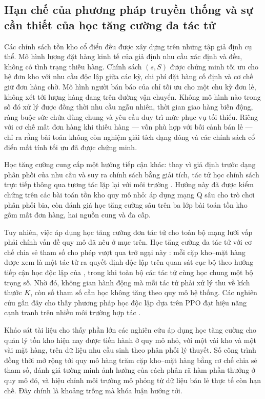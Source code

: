 \subsection{Hạn chế của phương pháp truyền thống và sự cần thiết của học tăng
cường đa tác tử}
\label{subsec:khoangtrong}

Các chính sách tồn kho cổ điển đều được xây dựng trên những tập giả định cụ
thể. Mô hình lượng đặt hàng kinh tế của \textcite{harris1913} giả định nhu cầu
xác định và đều, không có tình trạng thiếu hàng. Chính sách $(s, S)$ được
\textcite{scarf1960} chứng minh tối ưu cho hệ đơn kho với nhu cầu độc lập giữa
các kỳ, chi phí đặt hàng cố định và cơ chế giữ đơn hàng chờ. Mô hình người bán
báo của \textcite{arrow1951} chỉ tối ưu cho một chu kỳ đơn lẻ, không xét tới
lượng hàng đang trên đường vận chuyển. Không mô hình nào trong số đó xử lý được
đồng thời nhu cầu ngẫu nhiên, thời gian giao hàng biến động, ràng buộc sức chứa
dùng chung và yêu cầu duy trì mức phục vụ tối thiểu. Riêng với cơ chế mất đơn
hàng khi thiếu hàng --- vốn phù hợp với bối cảnh bán lẻ --- \textcite{zipkin2008}
chỉ ra rằng bài toán không còn nghiệm giải tích dạng đóng và các chính sách cổ
điển mất tính tối ưu đã được chứng minh.

Học tăng cường cung cấp một hướng tiếp cận khác: thay vì giả định trước dạng
phân phối của nhu cầu và suy ra chính sách bằng giải tích, tác tử học chính
sách trực tiếp thông qua tương tác lặp lại với môi trường
\parencite{sutton2018}. Hướng này đã được kiểm chứng trên các bài toán tồn kho
quy mô nhỏ: \textcite{oroojlooyjadid2022} áp dụng mạng Q sâu cho trò chơi phân
phối bia, còn \textcite{gijsbrechts2022} đánh giá học tăng cường sâu trên ba
lớp bài toán tồn kho gồm mất đơn hàng, hai nguồn cung và đa cấp.

Tuy nhiên, việc áp dụng học tăng cường đơn tác tử cho toàn bộ mạng lưới vấp
phải chính vấn đề quy mô đã nêu ở mục trên. Học tăng cường đa tác tử với cơ chế
chia sẻ tham số cho phép vượt qua trở ngại này \parencite{gupta2017}: mỗi cặp
kho--mặt hàng được xem là một tác tử ra quyết định độc lập trên quan sát cục
bộ theo hướng tiếp cận học độc lập của \textcite{tan1993}, trong khi toàn bộ
các tác tử cùng học chung một bộ trọng số. Nhờ đó, không gian hành động mà mỗi
tác tử phải xử lý thu về kích thước $K$, còn số tham số cần học không tăng theo
quy mô hệ thống. Các nghiên cứu gần đây cho thấy phương pháp học độc lập dựa
trên PPO đạt hiệu năng cạnh tranh trên nhiều môi trường hợp tác
\parencite{dewitt2020ippo, yu2022mappo}.

Khảo sát tài liệu cho thấy phần lớn các nghiên cứu áp dụng học tăng cường cho
quản lý tồn kho hiện nay được tiến hành ở quy mô nhỏ, với một vài kho và một
vài mặt hàng, trên dữ liệu nhu cầu sinh theo phân phối lý thuyết. Số công trình
đồng thời mở rộng tới quy mô hàng trăm cặp kho--mặt hàng bằng cơ chế chia sẻ
tham số, đánh giá tường minh ảnh hưởng của cách phân rã hàm phần thưởng ở quy
mô đó, và hiệu chỉnh môi trường mô phỏng từ dữ liệu bán lẻ thực tế còn hạn chế.
Đây chính là khoảng trống mà khóa luận hướng tới.

